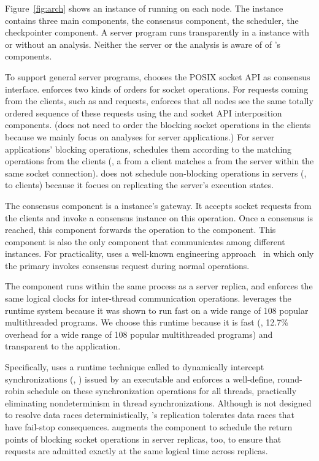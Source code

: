 Figure~\ref{fig:arch} shows an instance of \xxx running on 
each node. The instance contains three main components, the \paxos consensus 
component, the \dmt scheduler, the checkpointer component. A server program 
runs transparently in a \xxx instance with or without an analysis. Neither the 
server or the analysis is aware of of \xxx's components.

To support general server programs, \xxx chooses the POSIX socket API as
consensus interface. \xxx enforces two kinds of orders for socket
operations.  For requests coming from the clients, such as \connect and
\send requests, \xxx enforces that all nodes see the same totally ordered
sequence of these requests using the \paxos and socket API interposition
components.  (\xxx does not need to order the blocking socket operations
in the clients because we mainly focus on analyses for server applications.) 
For server applications' blocking operations, \xxx schedules them according to 
the matching operations from the clients (\eg, a \send from a client matches a 
\recv from the server within the same socket connection). \xxx does not 
schedule non-blocking operations in servers (\eg, \send to clients) because it 
focues on replicating the server's execution states.


The \paxos consensus component is a \xxx instance's gateway.  It accepts socket
requests from the clients and invoke a \paxos consensus instance on this 
operation. Once a consensus is reached, this component forwards the operation 
to the \dmt component. This component is also the only \xxx 
component that communicates among different \xxx instances. For practicality, 
\xxx uses a well-known \paxos engineering approach~\cite{paxos:practical} in 
which only the primary invokes consensus request during normal operations.

The \dmt component runs within the same process as a server replica, and
enforces the same logical clocks for inter-thread communication
operations. \xxx leverages the \parrot~\cite{parrot:sosp13} \dmt runtime
system because it was shown to run fast on a wide range of 108 popular
multithreaded programs. We choose this \dmt runtime because it is fast (\ie, 
12.7\% overhead for a wide range of 108 popular multithreaded programs) and 
transparent to the application.

Specifically, \parrot uses a runtime technique called \ldpreload to dynamically 
intercept \pthread synchronizations (\eg, \mutexlock) issued by an executable 
and enforces a well-define, round-robin schedule on these synchronization 
operations for all threads, practically eliminating nondeterminism in thread
synchronizations. Although \parrot is not designed to resolve data races
deterministically, \xxx's replication tolerates data races that have
fail-stop consequences.  \xxx augments the \dmt component to schedule the
return points of blocking socket operations in server replicas, too, to ensure 
that requests are admitted exactly at the same logical time across replicas.


